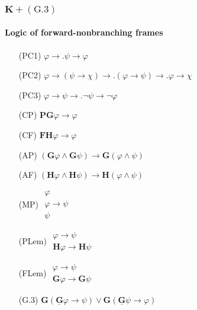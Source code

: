 \documentclass[xcolor=x11names]{beamer}
\newcommand{\FD}{\mathbf F}
\newcommand{\FB}{\mathbf G}
\newcommand{\PD}{\mathbf P}
\newcommand{\PB}{\mathbf H}
\newcommand{\FBDot}{\underline{\mathbf G}}
\newcommand{\lrule}[3][c]{\begin{array}{#1} #2  \\  \hline #3 \end{array}}
\newcommand{\lthen}{\rightarrow}
\begin{document}
\begin{frame}[t]
\frametitle{$\mathbf K+ (\mathrm G.3)$}
\framesubtitle{Logic of forward-nonbranching frames}
\footnotesize
\begin{minipage}[t]{5.78cm}
\begin{itemize}
\item[(PC1)] $\varphi \lthen .\psi \lthen \varphi$
\item[(PC2)] $\varphi\lthen (\psi \lthen \chi) \lthen\!\!. (\varphi \lthen \psi) \lthen\!\! . \varphi \lthen \chi$
\item[(PC3)] $\varphi \lthen \psi \lthen .\lnot \psi \lthen \lnot \varphi$
\item[(CP)] $\PD\FB\varphi \lthen \varphi $
\item[(CF)] $\FD\PB\varphi \lthen \varphi$
\item[(AP)] $(\FB\varphi \land \FB \psi )\lthen \FB(\varphi \land \psi )$
\item[(AF)] $(\PB\varphi \land \PB \psi )\lthen \PB(\varphi \land \psi )$
\item[(MP)] $\lrule {\varphi \\ \varphi \lthen \psi}{\psi}$
\item[(PLem)] $\lrule{\varphi\lthen \psi}{\PB\varphi \lthen \PB\psi}$
\item[(FLem)] $\lrule{\varphi\lthen \psi}{\FB\varphi \lthen \FB\psi}$
\end{itemize}
\end{minipage}\quad
\begin{minipage}[t]{4.5cm}
\begin{itemize}
\item[(G.3)] $\FB(\FBDot \varphi\lthen \psi ) \lor \FB(\FBDot \psi\lthen \varphi )$
\end{itemize}
\end{minipage}
\end{frame}

\end{document}
